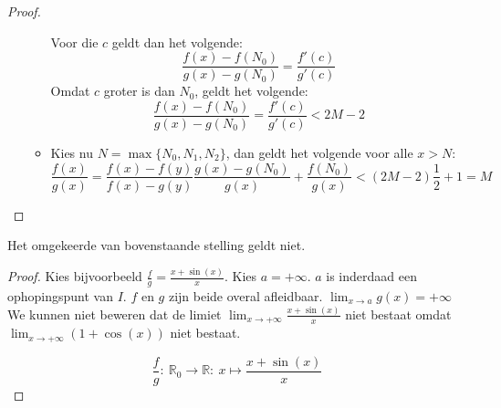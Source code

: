 \documentclass[main.tex]{subfiles}
\begin{document}
\begin{st}
\begin{proof}
\begin{itemize}
\begin{itemize}
        Voor die $c$ geldt dan het volgende:
        \[ \frac{f(x)-f(N_{0})}{g(x)-g(N_{0})} = \frac{f'(c)}{g'(c)} \]
        Omdat $c$ groter is dan $N_{0}$, geldt het volgende:
        \[ \frac{f(x)-f(N_{0})}{g(x)-g(N_{0})} = \frac{f'(c)}{g'(c)} < 2M-2 \]
      \item 
        Kies nu $N = \max\{N_{0},N_{1},N_{2}\}$, dan geldt het volgende voor alle $x>N$:
        \[ \frac{f(x)}{g(x)} = \frac{f(x)-f(y)}{f(x)-g(y)}  \frac{g(x)-g(N_{0})}{g(x)} + \frac{f(N_{0})}{g(x)} < (2M-2)\frac{1}{2} + 1 = M \]
      \end{itemize}
    \end{itemize}
  \end{proof}
\end{st}

\begin{tvb}
  Het omgekeerde van bovenstaande stelling geldt niet.
  
  \begin{proof}
    Kies bijvoorbeeld $\frac{f}{g} = \frac{x+\sin(x)}{x}$.
    Kies $a=+\infty$.
    $a$ is inderdaad een ophopingspunt van $I$.
    $f$ en $g$ zijn beide overal afleidbaar.
    $\lim_{x \rightarrow a}g(x) = +\infty$
    We kunnen niet beweren dat de limiet $\lim_{x\rightarrow +\infty}\frac{x+\sin(x)}{x}$ niet bestaat omdat $\lim_{x \rightarrow +\infty}(1+\cos(x))$ niet bestaat.

    \noindent
    \begin{minipage}{.45\textwidth}
    \begin{figure}[H]
      \centering
    \end{figure}
    \end{minipage}
    \begin{minipage}{.45\textwidth}
      \[ \frac{f}{g}:\ \mathbb{R}_{0} \rightarrow \mathbb{R}:\ x \mapsto \frac{x+\sin(x)}{x} \]
    \end{minipage}
  \end{proof}
\end{tvb}
\end{document}
